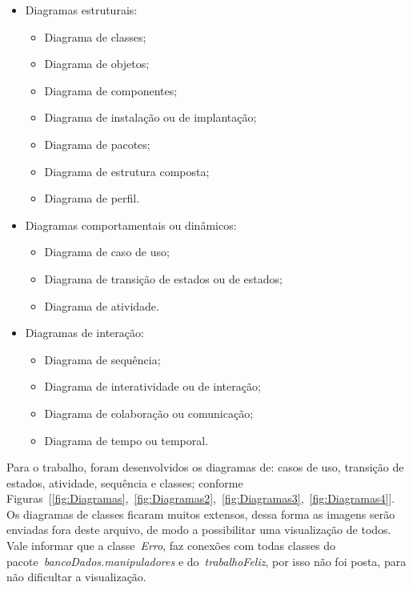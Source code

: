 \documentclass [12pt]{article}
\begin{document}
	\begin{multicols}{2}
		\begin{itemize}
			\item Diagramas estruturais:
				\begin{itemize}
					\item Diagrama de classes;
					\item Diagrama de objetos;
					\item Diagrama de componentes;
					\item Diagrama de instalação ou de implantação;
					\item Diagrama de pacotes;
					\item Diagrama de estrutura composta;
					\item Diagrama de perfil.
				\end{itemize}						
			
			\item Diagramas comportamentais ou dinâmicos:
				\begin{itemize}
					\item Diagrama de caso de uso;
					\item Diagrama de transição de estados ou de estados;
					\item Diagrama de atividade.
				\end{itemize}

			\item Diagramas de interação:
				\begin{itemize}
					\item Diagrama de sequência;
					\item Diagrama de interatividade ou de interação;
					\item Diagrama de colaboração ou comunicação;
					\item Diagrama de tempo ou temporal.
				\end{itemize}
		\end{itemize}
	\end{multicols}
	
	Para o trabalho, foram desenvolvidos os diagramas de: casos de uso, transição de estados, atividade, sequência e classes; conforme Figuras~[\ref{fig:Diagramas},~\ref{fig:Diagramas2},~\ref{fig:Diagramas3},~\ref{fig:Diagramas4}]. Os diagramas de classes ficaram muitos extensos, dessa forma as imagens serão enviadas fora deste arquivo, de modo a possibilitar uma visualização de todos. Vale informar que a classe~\emph{Erro}, faz conexões com todas classes do pacote~\emph{bancoDados.manipuladores} e do~\emph{trabalhoFeliz}, por isso não foi posta, para não dificultar a visualização.
\end{document}

